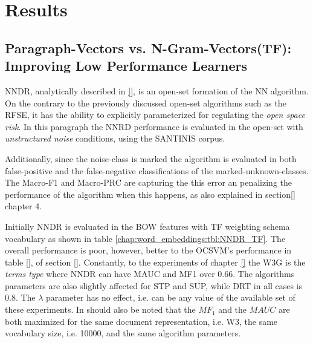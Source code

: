 \section{Results}\label{chap:word_embeddings:sec:results}

\subsection{Paragraph-Vectors vs. N-Gram-Vectors(TF): Improving Low Performance Learners}\label{chap:word_embeddings:sec:NNDR_PVBOW_vs_BOW}

NNDR, analytically described in \ref{}, is an open-set formation of the NN algorithm. On the contrary to the previously discussed open-set algorithms such as the RFSE, it has the ability to explicitly parameterized for regulating the \textit{open space risk}. In this paragraph the NNRD performance is evaluated in the open-set with \textit{unstructured noise} conditions, using the SANTINIS corpus.

Additionally, since the noise-class is marked the algorithm is evaluated in both false-positive and the false-negative classifications of the marked-unknown-classes. The Macro-F1 and Macro-PRC are capturing the this error an penalizing the performance of the algorithm when this happens, as also explained in section\ref{} chapter 4.

Initially NNDR is evaluated in the BOW features with TF weighting schema vocabulary as shown in table \ref{chap:word_embeddings:tbl:NNDR_TF}. The overall performance is poor, however, better to the OCSVM's performance in table \ref{}, of section \ref{}. Constantly, to the experiments of chapter \ref{} the W3G is the \textit{terms type} where NNDR can have MAUC and MF1 over $0.66$. The algorithms parameters are also slightly affected for STP and SUP, while DRT in all cases is $0.8$. The $\lambda$ parameter has no effect, i.e. can be any value of the available set of these experiments. In should also be noted that the $MF_{1}$ and the $MAUC$ are both maximized for the same document representation, i.e. W3, the same vocabulary size, i.e. 10000, and the same algorithm parameters.

